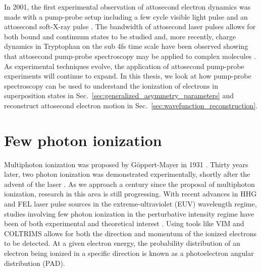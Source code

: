 In 2001, the first experimental observation of attosecond electron dynamics was made with a pump-probe setup including a few cycle visible light pulse and an attosecond soft-X-ray pulse \cite{hentschel2001}. The bandwidth of attosecond laser pulses allows for both bound and continuum states to be studied \cite{mauritsson2010} and, more recently, charge dynamics in Tryptophan on the sub 4fs time scale have been observed showing that attosecond pump-probe spectroscopy may be applied to complex molecules \cite{larasstiaso2018}. As experimental techniques evolve, the application of attosecond pump-probe experiments will continue to expand. In this thesis, we look at how pump-probe spectroscopy can be used to understand the ionization of electrons in superposition states in Sec.~\ref{sec:generalized_asymmetry_parameters} and reconstruct attosecond electron motion in Sec.~\ref{sec:wavefunction_reconstruction}.

\section{Few photon ionization} %
\label{sec:few_photon_ionization}
Multiphoton ionization was proposed by G\"oppert-Mayer in 1931 \cite{goppertmayer1931}. Thirty years later, two photon ionization was demonstrated experimentally, shortly after the advent of the laser \cite{kaiser1961}. As we approach a century since the proposal of multiphoton ionization, research in this area is still progressing. With recent advances in HHG and FEL laser pulse sources in the extreme-ultraviolet (EUV) wavelength regime, studies involving few photon ionization in the perturbative intensity regime have been of both experimental and theoretical interest \cite{nikolopoulos2001,vanderhart2005,shakeshaft2007,pi2010,florescu2011,sato2011,haber2011,florescu2012,ishikawa2012,ishikawa2013,ma2013,rey2014,grum-grzhimailo2015,douguet2016,hofbrucker2017,hofbrucker2018,boll2019,wang2019}. Using tools like VIM and COLTRIMS allows for both the direction and momentum of the ionized electrons to be detected. At a given electron energy, the probability distribution of an electron being ionized in a specific direction is known as a photoelectron angular distribution (PAD). 

